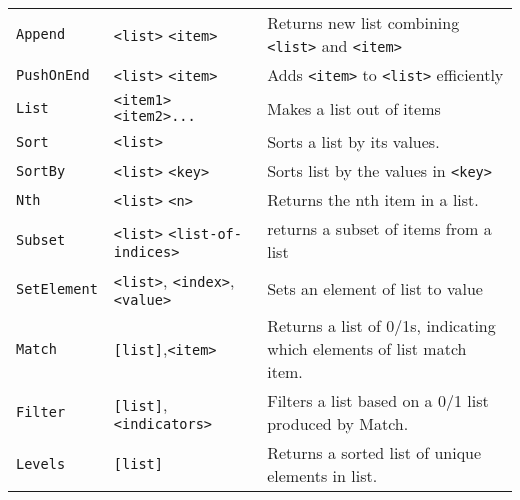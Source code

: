 \begin{longtable}{p{3cm}p{3cm}p{6cm}}
\verb+Append+ &\verb+<list>+ \verb+<item>+ & Returns new list combining  \verb+<list>+ and \verb+<item>+ \\ 
\verb+PushOnEnd+ &\verb+<list>+ \verb+<item>+ & Adds \verb+<item>+ to \verb+<list>+ efficiently \\ 
\verb+List+ &\verb+<item1>+ \verb+<item2>...+ &Makes a list out of items\\ 
\verb+Sort+ &\verb+<list>+ &Sorts a list by its values. \\ 
\verb+SortBy+ &\verb+<list>+ \verb+<key>+ & Sorts list by the values in \verb+<key>+ \\ 
\verb+Nth+ &\verb+<list>+ \verb+<n>+ &Returns the nth item in a list.\\ 
\verb+Subset+ &\verb+<list>+ \verb+<list-of-indices>+ & returns a subset of items from a list\\ 
\verb+SetElement+&\verb+<list>+, \verb+<index>+, \verb+<value>+&Sets an element of list to value\\
\verb+Match+&\verb+[list]+,\verb+<item>+&Returns a list of 0/1s, indicating which elements of list match item.\\

\verb+Filter+&\verb+[list]+,\verb+<indicators>+& Filters a list based on a 0/1 list produced by Match.\\

\verb+Levels+&\verb+[list]+&Returns a sorted list of unique elements in list.\\


\end{longtable}
